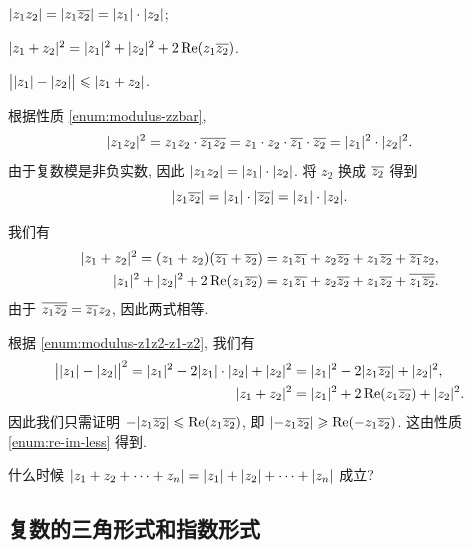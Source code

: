 \begin{exampleenum}[证明:]
  \item $\lvert z_1z_2\rvert=\lvert z_1\overline{z_2}\rvert=\lvert z_1\rvert\cdot\lvert z_2\rvert$;
  \label{enum:modulus-z1z2-z1-z2}
  \item $\lvert z_1+z_2\rvert^2=\lvert z_1\rvert^2+\lvert z_2\rvert^2+2\operatorname{Re}(z_1\overline{z_2})$.
  \item $\bigl\vert\lvert z_1\rvert-\lvert z_2\rvert\bigr\vert\leqslant\lvert z_1+z_2\rvert$.
\end{exampleenum}

\begin{proofenumr}
  \item 根据性质 \ref{enum:modulus-zzbar},
  \[
      \lvert z_1z_2\rvert^2=z_1z_2\cdot\overline{z_1}\overline{z_2}
    =z_1\cdot z_2\cdot \overline{z_1}\cdot \overline{z_2}
    =\lvert z_1\rvert^2\cdot\lvert z_2\rvert^2.
  \]
  由于复数模是非负实数, 因此 $\lvert z_1z_2\rvert=\lvert z_1\rvert\cdot\lvert z_2\rvert$.
  将 $z_2$ 换成 $\overline{z_2}$ 得到
  \[
      \lvert z_1\overline{z_2}\rvert
    =\lvert z_1\rvert\cdot\lvert\overline{z_2}\rvert
    =\lvert z_1\rvert\cdot\lvert z_2\rvert.
  \]
  \item 我们有
  \begin{align*}
      \lvert z_1+z_2\rvert^2
    =(z_1+z_2)(\overline{z_1}+\overline{z_2})&
    =z_1\overline{z_1}+z_2\overline{z_2}+z_1\overline{z_2}+\overline{z_1}z_2,\\
      \lvert z_1\rvert^2+\lvert z_2\rvert^2+2\operatorname{Re}(z_1\overline{z_2})&
    =z_1\overline{z_1}+z_2\overline{z_2}+z_1\overline{z_2}+\overline{z_1\overline{z_2}}.
  \end{align*}
  由于 $\overline{z_1\overline{z_2}}=\overline{z_1}z_2$, 因此两式相等.
  \item 根据 \ref{enum:modulus-z1z2-z1-z2}, 我们有
  \begin{align*}
      \bigl\vert\lvert z_1\rvert-\lvert z_2\rvert\bigr\vert^2
    =\lvert z_1\rvert^2-2\lvert z_1\rvert\cdot\lvert z_2\rvert+\lvert z_2\rvert^2&
    =\lvert z_1\rvert^2-2\lvert z_1 \overline{z_2}\rvert+\lvert z_2\rvert^2,\\
      \lvert z_1+z_2\rvert^2&
    =\lvert z_1\rvert^2+2\operatorname{Re}(z_1 \overline{z_2})+\lvert z_2\rvert^2.
  \end{align*}
  因此我们只需证明 $-\lvert z_1 \overline{z_2}\rvert\leqslant \operatorname{Re}(z_1 \overline{z_2})$, 即 $\lvert-z_1 \overline{z_2}\rvert\geqslant \operatorname{Re}(-z_1 \overline{z_2})$.
  这由性质 \ref{enum:re-im-less} 得到.
  \qedhere
\end{proofenumr}

\begin{exercise}
  什么时候 $\lvert z_1+z_2+\cdots+z_n\rvert=\lvert z_1\rvert+\lvert z_2\rvert+\cdots+\lvert z_n\rvert$ 成立?
\end{exercise}


\subsection{复数的三角形式和指数形式}


